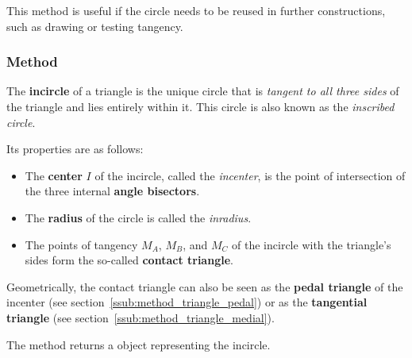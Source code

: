 \noindent
This method is useful if the circle needs to be reused in further constructions, such as drawing or testing tangency.

\vspace{1em}

\begin{tkzexample}[latex=.5\textwidth]
\begin{center}
\end{center}
\end{tkzexample}


\subsubsection{Method } %
\label{ssub:method_triangle_in_circle}

The \textbf{incircle} of a triangle is the unique circle that is \emph{tangent to all three sides} of the triangle and lies entirely within it. This circle is also known as the \emph{inscribed circle}.

\medskip
\noindent
Its properties are as follows:
\begin{itemize}
  \item The \textbf{center} $I$ of the incircle, called the \emph{incenter}, is the point of intersection of the three internal \textbf{angle bisectors}.
  \item The \textbf{radius} of the circle is called the \emph{inradius}.
  \item The points of tangency $M_A$, $M_B$, and $M_C$ of the incircle with the triangle's sides form the so-called \textbf{contact triangle}.
\end{itemize}

\noindent
Geometrically, the contact triangle can also be seen as the \textbf{pedal triangle} of the incenter (see section~\ref{ssub:method_triangle_pedal}) or as the \textbf{tangential triangle} (see section~\ref{ssub:method_triangle_medial}).

\medskip
\noindent
The method  returns a  object representing the incircle.

